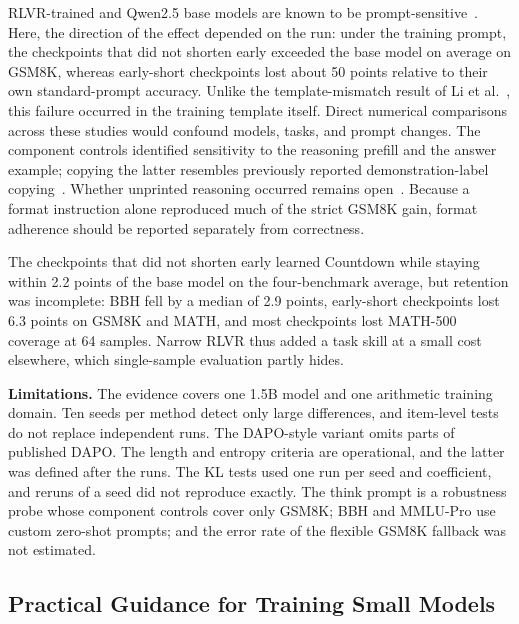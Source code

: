 \documentclass[ai,article,submit,oneauthor]{Definitions/mdpi}
\begin{document}
RLVR-trained and Qwen2.5 base models are known to be prompt-sensitive~\cite{li2025onedomain,zhou2026promptrobustness,liu2025understanding}. Here, the direction of the effect depended on the run: under the training prompt, the checkpoints that did not shorten early exceeded the base model on average on GSM8K, whereas early-short checkpoints lost about 50 points relative to their own standard-prompt accuracy. Unlike the template-mismatch result of Li et al.~\cite{li2025onedomain}, this failure occurred in the training template itself. Direct numerical comparisons across these studies would confound models, tasks, and prompt changes. The component controls identified sensitivity to the reasoning prefill and the answer example; copying the latter resembles previously reported demonstration-label copying~\cite{lyu2023zicl,ali2026copybias}. Whether unprinted reasoning occurred remains open~\cite{yu2026outcomerewards}. Because a format instruction alone reproduced much of the strict GSM8K gain, format adherence should be reported separately from correctness.

The checkpoints that did not shorten early learned Countdown while staying within 2.2 points of the base model on the four-benchmark average, but retention was incomplete: BBH fell by a median of 2.9 points, early-short checkpoints lost 6.3 points on GSM8K and MATH, and most checkpoints lost MATH-500 coverage at 64 samples. Narrow RLVR thus added a task skill at a small cost elsewhere, which single-sample evaluation partly hides.

\noindent\textbf{Limitations.}
The evidence covers one 1.5B model and one arithmetic training domain. Ten seeds per method detect only large differences, and item-level tests do not replace independent runs. The DAPO-style variant omits parts of published DAPO. The length and entropy criteria are operational, and the latter was defined after the runs. The KL tests used one run per seed and coefficient, and reruns of a seed did not reproduce exactly. The think prompt is a robustness probe whose component controls cover only GSM8K; BBH and MMLU-Pro use custom zero-shot prompts; and the error rate of the flexible GSM8K fallback was not estimated.

\subsection{Practical Guidance for Training Small Models}
\end{document}
